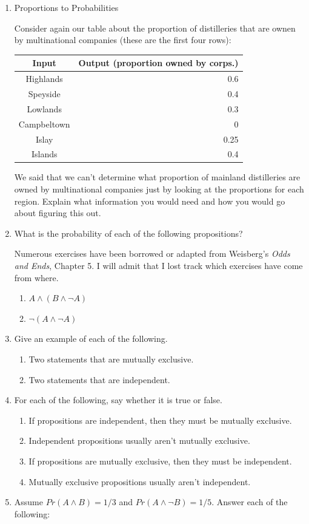 \documentclass[]{tufte-book}
\providecommand{\tightlist}{%
  \setlength{\itemsep}{0pt}\setlength{\parskip}{0pt}}
\begin{document}
\begin{enumerate}
\def\labelenumi{\arabic{enumi}.}
\item
  Proportions to Probabilities

  Consider again our table about the proportion of distilleries that are ownen by multinational companies (these are the first four rows):

  \begin{longtable}[]{@{}cr@{}}
  \toprule
  Input & Output (proportion owned by corps.)\tabularnewline
  \midrule
  \endhead
  Highlands & 0.6\tabularnewline
  Speyside & 0.4\tabularnewline
  Lowlands & 0.3\tabularnewline
  Campbeltown & 0\tabularnewline
  Islay & 0.25\tabularnewline
  Islands & 0.4\tabularnewline
  \bottomrule
  \end{longtable}

  We said that we can't determine what proportion of mainland distilleries are owned by multinational companies just by looking at the proportions for each region. Explain what information you would need and how you would go about figuring this out.
\item
  What is the probability of each of the following propositions?

  \begin{marginfigure}
   Numerous exercises have been borrowed or adapted from Weisberg's
   \emph{Odds and Ends}, Chapter 5. I will admit that I lost track which
   exercises have come from where.
   \end{marginfigure}

  \begin{enumerate}
  \def\labelenumii{\alph{enumii}.}
  \tightlist
  \item
    \(A \wedge (B \wedge \neg A)\)
  \item
    \(\neg (A \wedge \neg A)\)
  \end{enumerate}
\item
  Give an example of each of the following.

  \begin{enumerate}
  \def\labelenumii{\alph{enumii}.}
  \tightlist
  \item
    Two statements that are mutually exclusive.
  \item
    Two statements that are independent.
  \end{enumerate}
\item
  For each of the following, say whether it is true or false.

  \begin{enumerate}
  \def\labelenumii{\alph{enumii}.}
  \tightlist
  \item
    If propositions are independent, then they must be mutually exclusive.
  \item
    Independent propositions usually aren't mutually exclusive.
  \item
    If propositions are mutually exclusive, then they must be independent.
  \item
    Mutually exclusive propositions usually aren't independent.
  \end{enumerate}
\item
  Assume \(Pr(A \wedge B)=1/3\) and \(Pr(A \wedge \neg B)=1/5\). Answer each of the following:


\end{enumerate}
\end{document}
